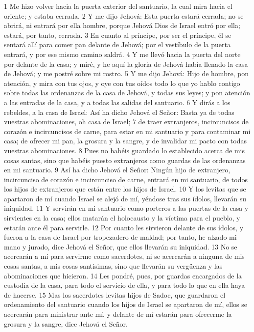 1 Me hizo volver hacia la puerta exterior del santuario, la cual mira hacia el oriente; y estaba cerrada.
2 Y me dijo Jehová: Esta puerta estará cerrada; no se abrirá, ni entrará por ella hombre, porque Jehová Dios de Israel entró por ella; estará, por tanto, cerrada.
3 En cuanto al príncipe, por ser el príncipe, él se sentará allí para comer pan delante de Jehová; por el vestíbulo de la puerta entrará, y por ese mismo camino saldrá.
4 Y me llevó hacia la puerta del norte por delante de la casa; y miré, y he aquí la gloria de Jehová había llenado la casa de Jehová; y me postré sobre mi rostro.
5 Y me dijo Jehová: Hijo de hombre, pon atención, y mira con tus ojos, y oye con tus oídos todo lo que yo hablo contigo sobre todas las ordenanzas de la casa de Jehová, y todas sus leyes; y pon atención a las entradas de la casa, y a todas las salidas del santuario.
6 Y dirás a los rebeldes, a la casa de Israel: Así ha dicho Jehová el Señor: Basta ya de todas vuestras abominaciones, oh casa de Israel;
7 de traer extranjeros, incircuncisos de corazón e incircuncisos de carne, para estar en mi santuario y para contaminar mi casa; de ofrecer mi pan, la grosura y la sangre, y de invalidar mi pacto con todas vuestras abominaciones.
8 Pues no habéis guardado lo establecido acerca de mis cosas santas, sino que habéis puesto extranjeros como guardas de las ordenanzas en mi santuario.
9 Así ha dicho Jehová el Señor: Ningún hijo de extranjero, incircunciso de corazón e incircunciso de carne, entrará en mi santuario, de todos los hijos de extranjeros que están entre los hijos de Israel.
10 Y los levitas que se apartaron de mí cuando Israel se alejó de mí, yéndose tras sus ídolos, llevarán su iniquidad.
11 Y servirán en mi santuario como porteros a las puertas de la casa y sirvientes en la casa; ellos matarán el holocausto y la víctima para el pueblo, y estarán ante él para servirle.
12 Por cuanto les sirvieron delante de sus ídolos, y fueron a la casa de Israel por tropezadero de maldad; por tanto, he alzado mi mano y jurado, dice Jehová el Señor, que ellos llevarán su iniquidad.
13 No se acercarán a mí para servirme como sacerdotes, ni se acercarán a ninguna de mis cosas santas, a mis cosas santísimas, sino que llevarán su vergüenza y las abominaciones que hicieron.
14 Les pondré, pues, por guardas encargados de la custodia de la casa, para todo el servicio de ella, y para todo lo que en ella haya de hacerse.
15 Mas los sacerdotes levitas hijos de Sadoc, que guardaron el ordenamiento del santuario cuando los hijos de Israel se apartaron de mí, ellos se acercarán para ministrar ante mí, y delante de mí estarán para ofrecerme la grosura y la sangre, dice Jehová el Señor.
